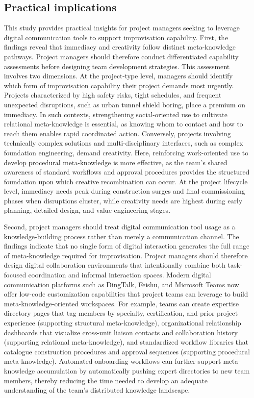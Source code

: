 \documentclass[authoryear,preprint,review,times,10pt]{elsarticle}
\begin{document}
\subsection{Practical implications}
This study provides practical insights for project managers seeking to leverage digital communication tools to support improvisation capability. First, the findings reveal that immediacy and creativity follow distinct meta-knowledge pathways. Project managers should therefore conduct differentiated capability assessments before designing team development strategies. This assessment involves two dimensions. At the project-type level, managers should identify which form of improvisation capability their project demands most urgently. Projects characterized by high safety risks, tight schedules, and frequent unexpected disruptions, such as urban tunnel shield boring, place a premium on immediacy. In such contexts, strengthening social-oriented use to cultivate relational meta-knowledge is essential, as knowing whom to contact and how to reach them enables rapid coordinated action. Conversely, projects involving technically complex solutions and multi-disciplinary interfaces, such as complex foundation engineering, demand creativity. Here, reinforcing work-oriented use to develop procedural meta-knowledge is more effective, as the team's shared awareness of standard workflows and approval procedures provides the structured foundation upon which creative recombination can occur. At the project lifecycle level, immediacy needs peak during construction surges and final commissioning phases when disruptions cluster, while creativity needs are highest during early planning, detailed design, and value engineering stages.

Second, project managers should treat digital communication tool usage as a knowledge-building process rather than merely a communication channel. The findings indicate that no single form of digital interaction generates the full range of meta-knowledge required for improvisation. Project managers should therefore design digital collaboration environments that intentionally combine both task-focused coordination and informal interaction spaces. Modern digital communication platforms such as DingTalk, Feishu, and Microsoft Teams now offer low-code customization capabilities that project teams can leverage to build meta-knowledge-oriented workspaces. For example, teams can create expertise directory pages that tag members by specialty, certification, and prior project experience (supporting structural meta-knowledge), organizational relationship dashboards that visualize cross-unit liaison contacts and collaboration history (supporting relational meta-knowledge), and standardized workflow libraries that catalogue construction procedures and approval sequences (supporting procedural meta-knowledge). Automated onboarding workflows can further support meta-knowledge accumulation by automatically pushing expert directories to new team members, thereby reducing the time needed to develop an adequate understanding of the team's distributed knowledge landscape.
\end{document}
